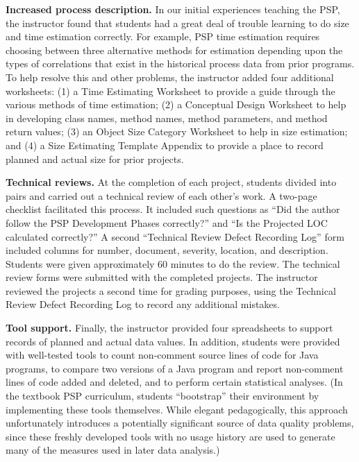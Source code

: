   {\bf Increased process description.} In our initial experiences teaching
  the PSP, the instructor found that students had a great deal of trouble
  learning to do size and time estimation correctly.  For example, PSP time
  estimation requires choosing between three alternative methods for
  estimation depending upon the types of correlations that exist in the
  historical process data from prior programs.  To help resolve this and
  other problems, the instructor added four additional worksheets: (1) a
  Time Estimating Worksheet to provide a guide through the various methods
  of time estimation; (2) a Conceptual Design Worksheet to help in
  developing class names, method names, method parameters, and method
  return values; (3) an Object Size Category Worksheet to help in size
  estimation; and (4) a Size Estimating Template Appendix to provide a
  place to record planned and actual size for prior projects.
  
  {\bf Technical reviews.} At the completion of each project, students
  divided into pairs and carried out a technical review of each other's
  work.  A two-page checklist facilitated this process.  It included such
  questions as ``Did the author follow the PSP Development Phases
  correctly?'' and ``Is the Projected LOC calculated correctly?''  A second
  ``Technical Review Defect Recording Log'' form included columns for
  number, document, severity, location, and description. Students were
  given approximately 60 minutes to do the review.  The technical review
  forms were submitted with the completed projects.  The instructor
  reviewed the projects a second time for grading purposes, using the
  Technical Review Defect Recording Log to record any additional mistakes.
  
  {\bf Tool support.} Finally, the instructor provided four spreadsheets to
  support records of planned and actual data values. In addition, students
  were provided with well-tested tools to count non-comment source lines of
  code for Java programs, to compare two versions of a Java program and
  report non-comment lines of code added and deleted, and to perform
  certain statistical analyses.  (In the textbook PSP curriculum, students
  ``bootstrap'' their environment by implementing these tools themselves.
  While elegant pedagogically, this approach unfortunately introduces a
  potentially significant source of data quality problems, since these
  freshly developed tools with no usage history are used to generate many
  of the measures used in later data analysis.)


